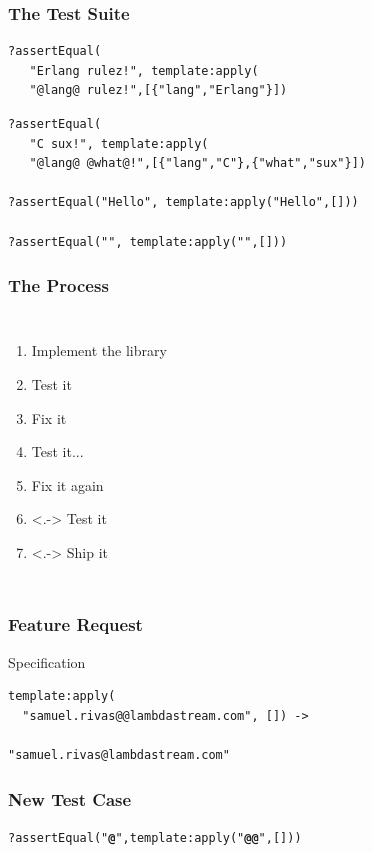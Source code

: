 \documentclass[xcolor=dvipsnames]{beamer}
\begin{document}
\begin{frame}[fragile]
  \frametitle{The Test Suite}
{\color{red}
\begin{verbatim}
?assertEqual(
   "Erlang rulez!", template:apply(
   "@lang@ rulez!",[{"lang","Erlang"}])
\end{verbatim}
}%
\begin{verbatim}
?assertEqual(
   "C sux!", template:apply(
   "@lang@ @what@!",[{"lang","C"},{"what","sux"}])

?assertEqual("Hello", template:apply("Hello",[]))

?assertEqual("", template:apply("",[]))
\end{verbatim}
\end{frame}

\begin{frame}
  \frametitle{The Process}
  \begin{center}
    \begin{columns}
      \begin{enumerate}
      \item Implement the library
      \item Test it
      \item Fix it
      \item<+-> Test it...
      \item<+-> Fix it again
      \item<.-> Test it
      \item<.-> Ship it
      \end{enumerate}
      \onslide<+->{%
        {\huge \textbf{\euro\euro\euro} !!}
      }
    \end{columns}
  \end{center}
\end{frame}

\begin{frame}[fragile]
  \frametitle{Feature Request}

  \begin{block}{Specification}%
\begin{verbatim}
template:apply(
  "samuel.rivas@@lambdastream.com", []) ->

"samuel.rivas@lambdastream.com"
\end{verbatim}
  \end{block}
\end{frame}

\begin{frame}[fragile]
  \frametitle{New Test Case}

\texttt{?assertEqual("\textbf{@}",template:apply("\textbf{@@}",[]))}
\end{frame}
\end{document}

